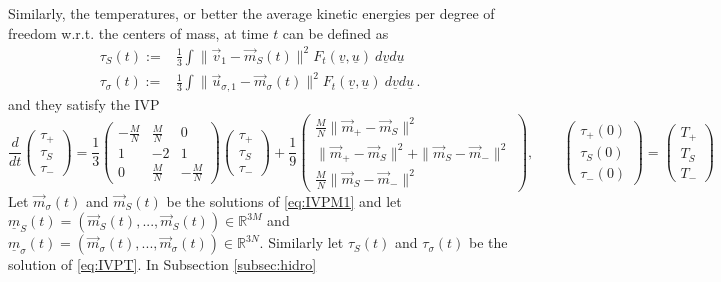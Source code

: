 \documentclass{article}
\newcommand*\R{ \mathds{R} }
\newcommand\uv{{\underline v}}
\newcommand\uu{{\underline u}}
\newcommand\vv{{\vec v}}
\newcommand\vu{{\vec u}}
\begin{document}
Similarly, the temperatures, or better the average kinetic energies per degree of freedom w.r.t. the centers of mass, at
time $t$ can be defined as
\begin{equation*}
\begin{aligned}
\tau_S(t):=&\frac 13\int \|\vv_1-\vec m_S(t)\|^2 F_t(\uv, \uu) \ d\uv d\uu\\
\tau_\sigma(t):=&\frac 13\int \|\vu_{\sigma,1}-\vec m_\sigma(t)\|^2 F_t( \uv, \uu) \  d\uv d\uu\, .
\end{aligned}
\end{equation*}
and they satisfy the IVP
\begin{equation}\label{eq:IVPT}
\frac{d}{dt}\begin{pmatrix}
		\tau_+ \\ \tau_S \\\tau _-
	\end{pmatrix}=
\frac 13\begin{pmatrix}
-\frac{M}{N} & \frac MN & 0\\
1 & -2 & 1\\
0 & \frac{M}{N} & -\frac MN
\end{pmatrix}
\begin{pmatrix}
		\tau_+ \\ \tau_S \\\tau _-
\end{pmatrix} + 
\frac 19\begin{pmatrix}
\frac{M}{N} \|\vec m_+-\vec m_S\|^2\\
\|\vec m_+-\vec m_S\|^2+ \|\vec 
m_S-\vec m_-\|^2\\
\frac{M}{N} \|\vec m_S-\vec m_-\|^2
\end{pmatrix},\qquad
\begin{pmatrix}
		\tau_+(0) \\ \tau_S(0) \\ \tau _-(0)
	\end{pmatrix}=
\begin{pmatrix}
		T_+ \\ T_S \\ T _-
	\end{pmatrix}
\end{equation}
Let $\vec m_\sigma(t)$ and $\vec m_S(t)$ be the solutions of \eqref{eq:IVPM1} and let $\underline m_S(t) = (\vec
m_S(t),...,\vec m_S(t)) \in \R^{3M}$ and $\underline m_\sigma(t) = (\vec m_\sigma(t),...,\vec m_\sigma(t)) \in \R^{3N}.$
Similarly let $\tau_S(t)$ and $\tau_\sigma(t)$ be the solution of \eqref{eq:IVPT}. In Subsection \ref{subsec:hidro}
\end{document}
